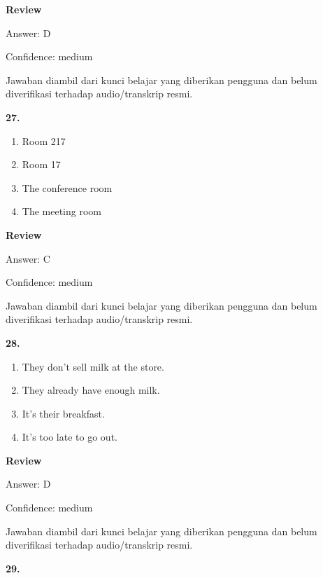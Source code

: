 \documentclass[12pt]{article}
\begin{document}
\par
\begingroup
\setlength{\parskip}{0pt}
\setlength{\parindent}{0pt}
\textbf{Review}\par
Answer: D\par
Confidence: medium\par
Jawaban diambil dari kunci belajar yang diberikan pengguna dan belum diverifikasi terhadap audio/transkrip resmi.\par
\endgroup
\par
\vspace{0.25\baselineskip}
\noindent\textbf{27.}
\begin{enumerate}[label=(\Alph*),leftmargin=*,itemsep=0.2em]
\item Room 217
\item Room 17
\item The conference room
\item The meeting room
\end{enumerate}
\par
\begingroup
\setlength{\parskip}{0pt}
\setlength{\parindent}{0pt}
\textbf{Review}\par
Answer: C\par
Confidence: medium\par
Jawaban diambil dari kunci belajar yang diberikan pengguna dan belum diverifikasi terhadap audio/transkrip resmi.\par
\endgroup
\par
\vspace{0.25\baselineskip}
\noindent\textbf{28.}
\begin{enumerate}[label=(\Alph*),leftmargin=*,itemsep=0.2em]
\item They don't sell milk at the store.
\item They already have enough milk.
\item It's their breakfast.
\item It's too late to go out.
\end{enumerate}
\par
\begingroup
\setlength{\parskip}{0pt}
\setlength{\parindent}{0pt}
\textbf{Review}\par
Answer: D\par
Confidence: medium\par
Jawaban diambil dari kunci belajar yang diberikan pengguna dan belum diverifikasi terhadap audio/transkrip resmi.\par
\endgroup
\par
\vspace{0.25\baselineskip}
\noindent\textbf{29.}
\end{document}
